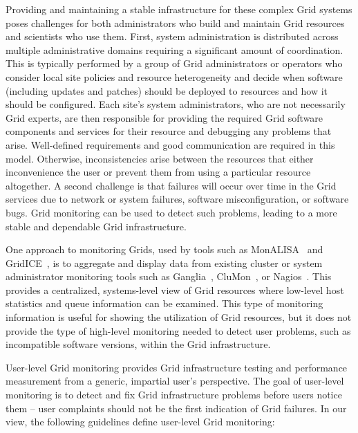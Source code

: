 \documentclass[times,10pt,twocolumn]{article}
\begin{document}
Providing and maintaining a stable infrastructure for these complex 
Grid systems poses challenges for both administrators who build and
maintain Grid resources and scientists who use them.  First, system
administration is distributed across multiple administrative domains 
requiring a significant amount of coordination.  This is typically performed by
a group of Grid administrators or operators who consider local site policies and
resource heterogeneity
and decide when software (including updates and patches) should be deployed to
resources and how it should be configured.  
Each site's system administrators, who are not necessarily Grid
experts, are then responsible for providing the required Grid software
components and services for their resource and debugging any problems that
arise.  Well-defined requirements and good communication are required in this
model.  Otherwise, inconsistencies arise between the resources that either
inconvenience the user or prevent them from using a particular resource
altogether.  A second challenge is that failures will occur over
time in the Grid services due to network or system failures, software
misconfiguration, or software bugs. 
Grid monitoring can be used to detect such problems, leading to a more
stable and dependable Grid infrastructure.

One approach to monitoring Grids, used by tools such as
MonALISA~\cite{monalisa} and GridICE~\cite{gridice}, is to aggregate and
display data from existing cluster or system administrator monitoring tools
such as Ganglia~\cite{ganglia}, CluMon~\cite{clumon}, or
Nagios~\cite{nagios}.  This provides a centralized, systems-level view of Grid
resources where low-level host statistics and queue information can be
examined.  This type of monitoring information is useful for showing the
utilization of Grid resources, but it does not provide the type of
high-level monitoring needed to detect user problems, such as incompatible
software versions, within the Grid infrastructure.

User-level Grid monitoring provides Grid infrastructure testing and performance measurement 
from a generic, impartial user's perspective.  The goal of user-level monitoring is 
to detect and fix Grid infrastructure problems before users notice them -- 
user complaints should not be the first indication of Grid failures.  
In our view, the following guidelines define user-level Grid monitoring: 
\end{document}
